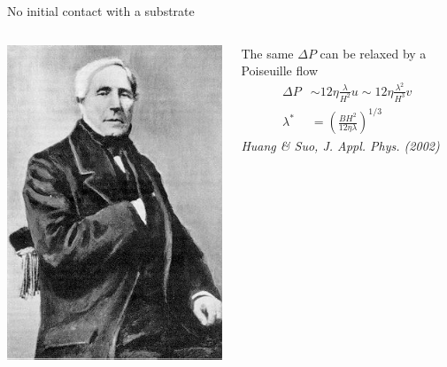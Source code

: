 \begin{frame}{No initial contact with a substrate}
\begin{columns}
\includegraphics[width=\textwidth]{Jean-Leonard-Marie_Poiseuille.jpg}\\
\hfill{}

The same $\Delta P$ can be relaxed by a Poiseuille flow
\begin{align*}
\Delta P &\sim 12\eta\frac{\lambda}{H^2} u \sim 12\eta\frac{\lambda^2}{H^3} v\\
\lambda^* &= \left(\frac{B H^2}{12\eta\lambda}\right)^{1/3}
\end{align*}
\textit{\footnotesize Huang \& Suo, J. Appl. Phys. (2002)}

\end{columns}
\end{frame}

